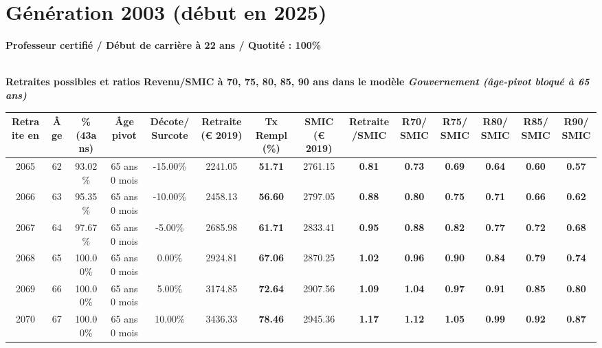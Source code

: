 \newpage 
 
\section{Génération 2003 (début en 2025)\label{ProfCertifie_100_2003_22_0}} 
 
{\bf \noindent Professeur certifié / Début de carrière à 22 ans / Quotité : 100\%}  ~ 

 ~\\{\bf \noindent Retraites possibles et ratios Revenu/SMIC à 70, 75, 80, 85, 90 ans dans le modèle \emph{Gouvernement (âge-pivot bloqué à 65 ans)}}  
 
\begin{adjustbox}{max width=\textwidth} 
\begin{tabular}[htb]{|c|c||c|c|c||c|c||c|c||c|c|c|c|c|} 
\hline 
 Retraite en &  Âge &  \%(43ans) &  Âge pivot &  Décote/Surcote &  Retraite (\euro{} 2019) &  Tx Rempl(\%) &  SMIC (\euro{} 2019) &  Retraite/SMIC &  R70/SMIC &  R75/SMIC &  R80/SMIC &  R85/SMIC &  R90/SMIC \\ 
\hline \hline 
 2065 &  62 &  93.02\% &  65 ans 0 mois &  -15.00\% &  2241.05 &  {\bf 51.71} &  2761.15 &  {\bf {\color{red} 0.81}} &  {\bf {\color{red} 0.73}} &  {\bf {\color{red} 0.69}} &  {\bf {\color{red} 0.64}} &  {\bf {\color{red} 0.60}} &  {\bf {\color{red} 0.57}} \\ 
\hline 
 2066 &  63 &  95.35\% &  65 ans 0 mois &  -10.00\% &  2458.13 &  {\bf 56.60} &  2797.05 &  {\bf {\color{red} 0.88}} &  {\bf {\color{red} 0.80}} &  {\bf {\color{red} 0.75}} &  {\bf {\color{red} 0.71}} &  {\bf {\color{red} 0.66}} &  {\bf {\color{red} 0.62}} \\ 
\hline 
 2067 &  64 &  97.67\% &  65 ans 0 mois &  -5.00\% &  2685.98 &  {\bf 61.71} &  2833.41 &  {\bf {\color{red} 0.95}} &  {\bf {\color{red} 0.88}} &  {\bf {\color{red} 0.82}} &  {\bf {\color{red} 0.77}} &  {\bf {\color{red} 0.72}} &  {\bf {\color{red} 0.68}} \\ 
\hline 
 2068 &  65 &  100.00\% &  65 ans 0 mois &  0.00\% &  2924.81 &  {\bf 67.06} &  2870.25 &  {\bf 1.02} &  {\bf {\color{red} 0.96}} &  {\bf {\color{red} 0.90}} &  {\bf {\color{red} 0.84}} &  {\bf {\color{red} 0.79}} &  {\bf {\color{red} 0.74}} \\ 
\hline 
 2069 &  66 &  100.00\% &  65 ans 0 mois &  5.00\% &  3174.85 &  {\bf 72.64} &  2907.56 &  {\bf 1.09} &  {\bf 1.04} &  {\bf {\color{red} 0.97}} &  {\bf {\color{red} 0.91}} &  {\bf {\color{red} 0.85}} &  {\bf {\color{red} 0.80}} \\ 
\hline 
 2070 &  67 &  100.00\% &  65 ans 0 mois &  10.00\% &  3436.33 &  {\bf 78.46} &  2945.36 &  {\bf 1.17} &  {\bf 1.12} &  {\bf 1.05} &  {\bf {\color{red} 0.99}} &  {\bf {\color{red} 0.92}} &  {\bf {\color{red} 0.87}} \\ 
\hline 
\hline 
\end{tabular} 
\end{adjustbox} 
 
